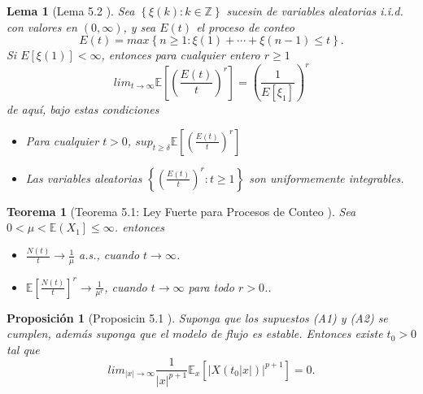 \documentclass{article}
\newtheorem{Teo}{Teorema}[section]
\newtheorem{Prop}{Proposición}[section]
\newtheorem{Lema}{Lema}[section]
\newcommand{\ent}{\mathbb{Z}}
\newcommand{\esp}{\mathbb{E}}
\numberwithin{equation}{section}
\begin{document}
\begin{Lema}[Lema 5.2 \cite{Gut}]\label{Lema.5.2.Gut}
Sea $\left\{\xi\left(k\right):k\in\ent\right\}$ sucesin de variables aleatorias i.i.d. con valores en
$\left(0,\infty\right)$, y sea $E\left(t\right)$ el proceso de conteo \[E\left(t\right)=max\left\{n\geq1:\xi\left(1\right)+\cdots+\xi\left(n-1\right)\leq t\right\}.\]
Si $E\left[\xi\left(1\right)\right]<\infty$, entonces para cualquier entero $r\geq1$
\begin{equation}
lim_{t\rightarrow\infty}\esp\left[\left(\frac{E\left(t\right)}{t}\right)^{r}\right]=\left(\frac{1}{E\left[\xi_{1}\right]}\right)^{r}
\end{equation}
de aqu\'i, bajo estas condiciones
\begin{itemize}
\item[a)] Para cualquier $t>0$, $sup_{t\geq\delta}\esp\left[\left(\frac{E\left(t\right)}{t}\right)^{r}\right]$
\item[b)] Las variables aleatorias $\left\{\left(\frac{E\left(t\right)}{t}\right)^{r}:t\geq1\right\}$ son uniformemente integrables.
\end{itemize}
\end{Lema}

\begin{Teo}[Teorema 5.1: Ley Fuerte para Procesos de Conteo \cite{Gut}]\label{Tma.5.1.Gut} Sea $0<\mu<\esp\left(X_{1}\right]\leq\infty$. entonces

\begin{itemize}
\item[a)] $\frac{N\left(t\right)}{t}\rightarrow\frac{1}{\mu}$
a.s., cuando $t\rightarrow\infty$.

\item[b)]$\esp\left[\frac{N\left(t\right)}{t}\right]^{r}\rightarrow\frac{1}{\mu^{r}}$, cuando $t\rightarrow\infty$ para todo $r>0$..
\end{itemize}
\end{Teo}

\begin{Prop}[Proposicin 5.1 \cite{DaiSean}]\label{Prop.5.1}
Suponga que los supuestos (A1) y (A2) se cumplen, adem\'as suponga que el modelo de flujo es estable. Entonces existe $t_{0}>0$ tal que
\begin{equation}\label{Eq.Prop.5.1}
lim_{|x|\rightarrow\infty}\frac{1}{|x|^{p+1}}\esp_{x}\left[|X\left(t_{0}|x|\right)|^{p+1}\right]=0.
\end{equation}

\end{Prop}
\end{document}

